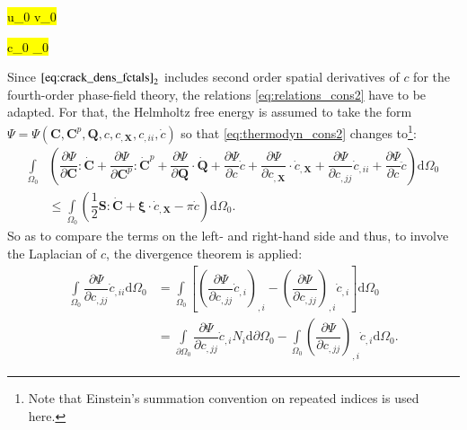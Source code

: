 \hl{ u_{0} \text{ } v_{0} }

\hl{ c_{0}  _{0} }


Since $\eqref{eq:crack_dens_fctals}_{2}$ includes second order spatial derivatives of $c$ for the fourth-order phase-field theory, the relations \eqref{eq:relations_cons2} have to be adapted. For that, the Helmholtz free energy is assumed to take the form $\Psi=\Psi\left(\mathbf{C},\mathbf{C}^{p},\mathbf{Q},c,c_{,\mathbf{X}},c_{,ii},\dot{c}\right)$ so that \eqref{eq:thermodyn_cons2} changes to\footnote{Note that Einstein's summation convention on repeated indices is used here.}:
\begin{equation} \label{eq:thermodyn_cons4}
	\begin{aligned}
	\int\limits_{\Omega_{0}}&\left(\dfrac{\partial\Psi}{\partial\mathbf{C}}:\dot{\mathbf{C}}+\dfrac{\partial\Psi}{\partial\mathbf{C}^{p}}:\dot{\mathbf{C}}^{p}+\dfrac{\partial\Psi}{\partial\mathbf{Q}}\cdot\dot{\mathbf{Q}}+\dfrac{\partial\Psi}{\partial c}\dot{c}+\dfrac{\partial\Psi}{\partial c_{,\mathbf{X}}}\cdot\dot{c}_{,\mathbf{X}}+\dfrac{\partial\Psi}{\partial c_{,jj}}\dot{c}_{,ii}+\dfrac{\partial\Psi}{\partial\dot{c}}\ddot{c}\right)\mathrm{d}\Omega_{0} \\
	&\leq \int\limits_{\Omega_{0}}\left(\dfrac{1}{2}\mathbf{S}:\dot{\mathbf{C}}+\bm{\xi}\cdot\dot{c}_{,\mathbf{X}}-\pi\dot{c}\right)\mathrm{d}\Omega_{0}.
	\end{aligned}
\end{equation}
So as to compare the terms on the left- and right-hand side and thus, to involve the Laplacian of $c$, the divergence theorem is applied:
\begin{equation} \label{eq:div_theorem_Lapl_c}
	\begin{aligned}
		\int\limits_{\Omega_{0}}\dfrac{\partial\Psi}{\partial c_{,jj}}\dot{c}_{,ii}\mathrm{d}\Omega_{0} &= \int\limits_{\Omega_{0}}\left[\left(\dfrac{\partial\Psi}{\partial c_{,jj}}\dot{c}_{,i}\right)_{,i}-\left(\dfrac{\partial\Psi}{\partial c_{,jj}}\right)_{,i}\dot{c}_{,i}\right]\mathrm{d}\Omega_{0} \\
		&= \int\limits_{\partial\Omega_{0}}\dfrac{\partial\Psi}{\partial c_{,jj}}\dot{c}_{,i}N_{i}\mathrm{d}\partial\Omega_{0}-\int\limits_{\Omega_{0}}\left(\dfrac{\partial\Psi}{\partial c_{,jj}}\right)_{,i}\dot{c}_{,i}\mathrm{d}\Omega_{0}.
	\end{aligned}
\end{equation}
